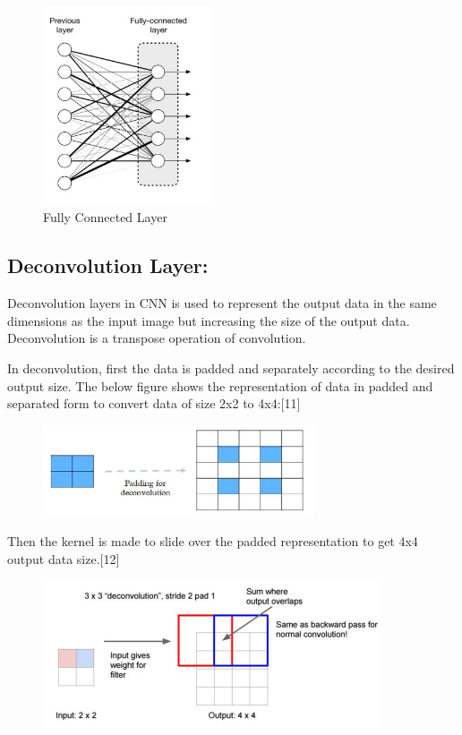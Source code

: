\documentclass{IEEEtran}
\begin{document}
\begin{figure}[h]
    \centering
    \captionsetup{justification=centering}
    \includegraphics[width=5cm]{fcn}
    \caption{Fully Connected Layer}
    \label{fig: Fully Connected Layer}
\end{figure}

\subsection{\textbf{Deconvolution Layer:}}
Deconvolution layers in CNN is used to represent the output data in the same dimensions as the input image but increasing the size of the output data. Deconvolution is a transpose operation of convolution. 

In deconvolution, first the data is padded and separately according to the desired output size. The below figure shows the representation of data in padded and separated form to convert data of size 2x2 to 4x4:[11]

\begin{figure}[h]
    \centering
    \captionsetup{justification=centering}
    \includegraphics[width=8cm]{deconv1}
    \caption{}
    \label{fig:}
\end{figure}
 
Then the kernel is made to slide over the padded representation to get 4x4 output data size.[12]

\begin{figure}[h]
    \centering
    \captionsetup{justification=centering}
    \includegraphics[width=10cm]{deconv2}
    \caption{}
    \label{fig:}
\end{figure}
\end{document}
